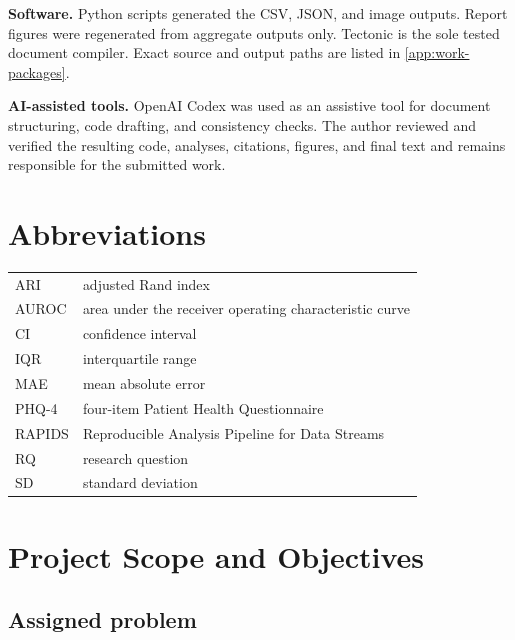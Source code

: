 \documentclass[a4paper,11pt,oneside]{report}
\begin{document}
\textbf{Software.} Python scripts generated the CSV, JSON, and image outputs.
Report figures were regenerated from aggregate outputs only. Tectonic is the sole
tested document compiler. Exact source and output paths are listed in
\cref{app:work-packages}.

\textbf{AI-assisted tools.} OpenAI Codex was used as an assistive tool for document structuring, code drafting, and consistency checks. The author reviewed and verified the resulting code, analyses, citations, figures, and final text and remains responsible for the submitted work.

\tableofcontents

\clearpage
{}
{}
\listoffigures

\clearpage
{}
{}
\listoftables

\clearpage
\chapter*{Abbreviations}
{}
\begin{tabularx}{\textwidth}{@{}L{0.20\textwidth}Y@{}}
ARI & adjusted Rand index \\
AUROC & area under the receiver operating characteristic curve \\
CI & confidence interval \\
IQR & interquartile range \\
MAE & mean absolute error \\
PHQ-4 & four-item Patient Health Questionnaire \\
RAPIDS & Reproducible Analysis Pipeline for Data Streams \\
RQ & research question \\
SD & standard deviation \\
\end{tabularx}
\clearpage

\setcounter{page}{1}

\chapter{Project Scope and Objectives}
\label{ch:scope}

\section{Assigned problem}
\end{document}

